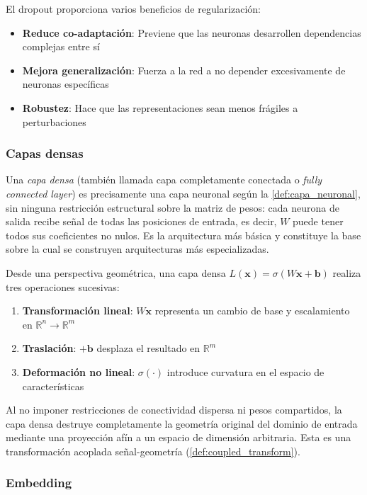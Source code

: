 El dropout proporciona varios beneficios de regularización:
\begin{itemize}
	\item \textbf{Reduce co-adaptación}: Previene que las neuronas desarrollen dependencias complejas entre sí
	\item \textbf{Mejora generalización}: Fuerza a la red a no depender excesivamente de neuronas específicas
	\item \textbf{Robustez}: Hace que las representaciones sean menos frágiles a perturbaciones
\end{itemize}

\subsubsection{Capas densas}\label{def:capa_densa}

Una \textit{capa densa} (también llamada capa completamente conectada o \textit{fully connected layer}) es precisamente una capa neuronal según la \autoref{def:capa_neuronal}, sin ninguna restricción estructural sobre la matriz de pesos: cada neurona de salida recibe señal de todas las posiciones de entrada, es decir, $W$ puede tener todos sus coeficientes no nulos. Es la arquitectura más básica y constituye la base sobre la cual se construyen arquitecturas más especializadas.

Desde una perspectiva geométrica, una capa densa $L(\mathbf{x}) = \sigma(W\mathbf{x} + \mathbf{b})$ realiza tres operaciones sucesivas:
\begin{enumerate}
	\item \textbf{Transformación lineal}: $W\mathbf{x}$ representa un cambio de base y escalamiento en $\mathbb{R}^n \to \mathbb{R}^m$
	\item \textbf{Traslación}: $+ \mathbf{b}$ desplaza el resultado en $\mathbb{R}^m$
	\item \textbf{Deformación no lineal}: $\sigma(\cdot)$ introduce curvatura en el espacio de características
\end{enumerate}

Al no imponer restricciones de conectividad dispersa ni pesos compartidos, la capa densa destruye completamente la geometría original del dominio de entrada mediante una proyección afín a un espacio de dimensión arbitraria. Esta es una transformación acoplada señal-geometría (\autoref{def:coupled_transform}).

\subsubsection{Embedding}

